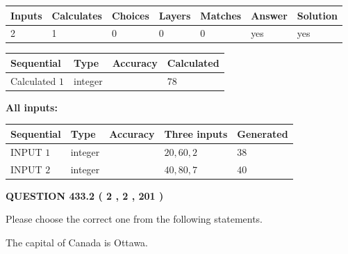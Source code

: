 \documentclass[12pt]{article}
\begin{document}
 

 
   
   
   
   
\noindent\begin{tabular}{|l|l|l|l|l|l|l|}
 \hline
Inputs & Calculates & Choices & Layers & Matches & Answer & Solution \\ \hline
 2  & 
 1  & 
 0
  & 
 0  & 
 0  & 
  yes & 
  yes 
  \\ \hline
 \end{tabular}
   
   
   
   
\noindent{}
   
   
  
  
\noindent\begin{tabular}{|l|l|l|l|}
\hline
 Sequential & Type & Accuracy & Calculated \\ 
\hline
 
 
  Calculated $  1 $ & integer &  & 
  $ 78 $ 
 \\  \hline  
 \end{tabular}
   
   
   
   
\noindent\vspace{0.1in}\hspace{-0.08in} {\textbf{\Large{All inputs: }}}
   
   
  
  
\noindent\begin{tabular}{|l|l|l|l|l|}
\hline
 Sequential & Type & Accuracy & Three inputs & Generated \\ 
\hline
 
 
  INPUT $  1 $ & integer &  & $
 20
 , 
 60
 , 
 2
 $ & $ 38 $ 
 \\  \hline  
 
 
  INPUT $  2 $ & integer &  & $
 40
 , 
 80
 , 
 7
 $ & $ 40 $ 
 \\  \hline  
 \end{tabular}
   
   
  
\vspace{0.2in}
  
{\textbf{\Large{QUESTION
433.2 
 ( 2 , 2 , 201 )
}}}
  
  
Please choose the correct one from the following statements.
 
 
The capital of Canada is Ottawa.
 
\end{document}
